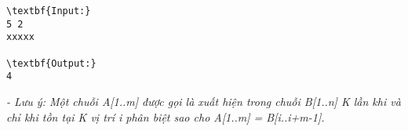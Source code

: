 \begin{verbatim}
\textbf{Input:}
5 2
xxxxx

\textbf{Output:}
4
\end{verbatim}

\emph{    - Lưu ý: Một chuỗi A[1..m] được gọi là xuất hiện trong chuỗi B[1..n] K lần khi và chỉ khi tồn tại K vị trí i phân biệt sao cho A[1..m] = B[i..i+m-1].   }